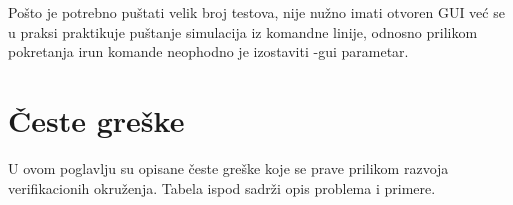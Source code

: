 Pošto je potrebno puštati velik broj testova, nije nužno imati otvoren GUI već
se u praksi praktikuje puštanje simulacija iz komandne linije, odnosno prilikom
pokretanja irun komande neophodno je izostaviti -gui parametar. 



\section{Česte greške}

U ovom poglavlju su opisane česte greške koje se prave prilikom razvoja
verifikacionih okruženja. Tabela ispod sadrži opis problema i primere.

